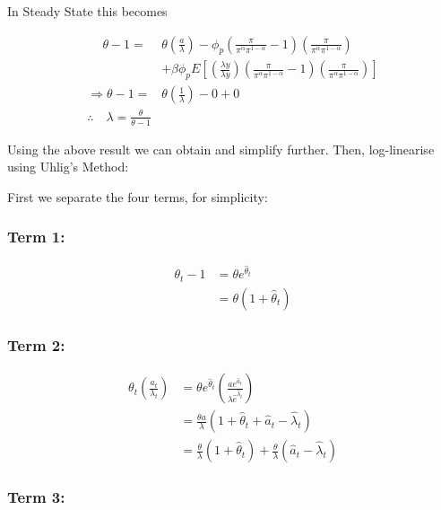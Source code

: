 \documentclass[11pt,preprint, authoryear]{elsarticle}
\numberwithin{equation}{section}
\numberwithin{figure}{section}
\numberwithin{table}{section}
\begin{document}
In Steady State this becomes

\[\begin{aligned}
\quad \ \theta-1=& \theta\left(\frac{a}{\lambda}\right)-\phi_{p}\left(\frac{\pi}{\pi^{\alpha} \pi^{1-\alpha}}-1\right)\left(\frac{\pi}{\pi^{\alpha} \pi^{1-\alpha}}\right) \\
&+\beta \phi_{p} E\left[\left(\frac{\lambda y}{\lambda y}\right)\left(\frac{\pi}{\pi^{\alpha} \pi^{1-\alpha}}-1\right)\left(\frac{\pi}{\pi^{\alpha} \pi^{1-\alpha}}\right)\right]\\
\Rightarrow \theta-1=& \theta\left(\frac{1}{\lambda}\right)-0 + 0 \\
\therefore \quad \lambda = \frac{\theta}{\theta-1}
\end{aligned}\]

Using the above result we can obtain and simplify further. Then,
log-linearise using Uhlig's Method:

First we separate the four terms, for simplicity:

\hypertarget{term-1}{%
\subsubsection{Term 1:}\label{term-1}}

\[\begin{aligned} \theta_{t}-1 & = \theta e^{\hat{\theta}_{t}} \\
& = \theta\left(1+\hat{\theta}_{t}\right) \end{aligned}\]

\hypertarget{term-2}{%
\subsubsection{Term 2:}\label{term-2}}

\[\begin{aligned} \theta_{t}\left(\frac{a_{t}}{\lambda_{t}}\right) &= \theta e^{\hat{\theta}_{t}}\left(\frac{a e^{\hat{a}_{t}}}{\lambda \hat{e}^{\hat{\lambda}_t}}\right)\\
&= \frac{\theta a}{\lambda}\left(1+\hat{\theta}_{t}+\hat{a}_{t}-\hat{\lambda}_{t}\right)\\
& = \frac{\theta}{\lambda}\left(1+\hat{\theta}_{t} \right)+ \frac{\theta}{\lambda} \left(\hat{a}_{t}-\hat{\lambda}_{t}\right)\end{aligned}\]

\hypertarget{term-3}{%
\subsubsection{Term 3:}\label{term-3}}
\end{document}
